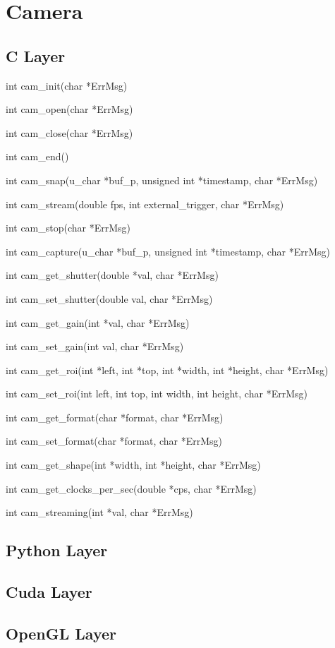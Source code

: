 \documentclass{report}
\begin{document}
\section{Camera}

\subsection{C Layer}

int cam_init(char *ErrMsg)

int cam_open(char *ErrMsg)

int cam_close(char *ErrMsg)

int cam_end()

int cam_snap(u_char *buf_p, unsigned int *timestamp, char *ErrMsg)

int cam_stream(double fps, int external_trigger, char *ErrMsg)

int cam_stop(char *ErrMsg)

int cam_capture(u_char *buf_p, unsigned int *timestamp, char *ErrMsg)

int cam_get_shutter(double *val, char *ErrMsg)

int cam_set_shutter(double val, char *ErrMsg)

int cam_get_gain(int *val, char *ErrMsg)

int cam_set_gain(int val, char *ErrMsg)

int cam_get_roi(int *left, int *top, int *width, int *height, char *ErrMsg)

int cam_set_roi(int left, int top, int width, int height, char *ErrMsg)	

int cam_get_format(char *format, char *ErrMsg)

int cam_set_format(char *format, char *ErrMsg)

int cam_get_shape(int *width, int *height, char *ErrMsg)

int cam_get_clocks_per_sec(double *cps, char *ErrMsg)

int cam_streaming(int *val, char *ErrMsg)


\subsection{Python Layer}

\subsection{Cuda Layer}

\subsection{OpenGL Layer}
\end{document}
